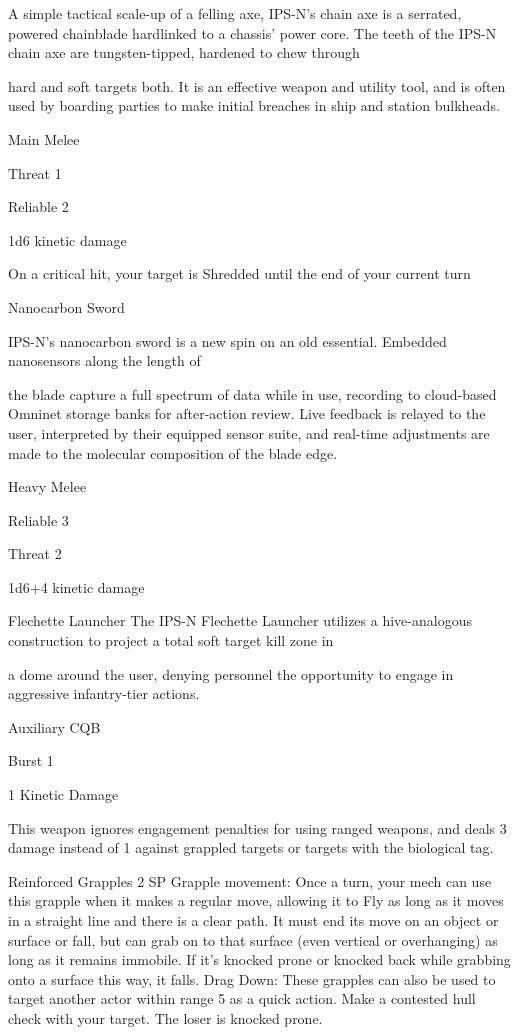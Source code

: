 A simple tactical scale-up of a felling axe, IPS-N’s chain axe is a serrated, powered chainblade hardlinked
to a chassis’ power core. The teeth of the IPS-N chain axe are tungsten-tipped, hardened to chew through

hard and soft targets both. It is an effective weapon and utility tool, and is often used by boarding parties to
make initial breaches in ship and station bulkheads.

Main Melee

Threat 1

Reliable 2

1d6 kinetic damage

On a critical hit, your target is Shredded until the end of your current turn


Nanocarbon Sword

IPS-N’s nanocarbon sword is a new spin on an old essential. Embedded nanosensors along the length of

the blade capture a full spectrum of data while in use, recording to cloud-based Omninet storage banks for
after-action review. Live feedback is relayed to the user, interpreted by their equipped sensor suite, and
real-time adjustments are made to the molecular composition of the blade edge.

Heavy Melee





Reliable 3

Threat 2

1d6+4 kinetic damage


Flechette Launcher
The IPS-N Flechette Launcher utilizes a hive-analogous construction to project a total soft target kill zone in

a dome around the user, denying personnel the opportunity to engage in aggressive infantry-tier actions.

Auxiliary CQB

Burst 1

1 Kinetic Damage

This weapon ignores engagement penalties for using ranged weapons, and deals 3 damage instead of 1 against grappled targets or targets with the biological tag.


Reinforced Grapples
2 SP
Grapple movement: Once a turn, your mech can use this grapple when it makes a regular move,
allowing it to Fly as long as it moves in a straight line and there is a clear path. It must end its
move on an object or surface or fall, but can grab on to that surface (even vertical or overhanging)
as long as it remains immobile. If it’s knocked prone or knocked back while grabbing onto a
surface this way, it falls.
Drag Down: These grapples can also be used to target another actor within range 5 as a quick
action. Make a contested hull check with your target. The loser is knocked prone.


